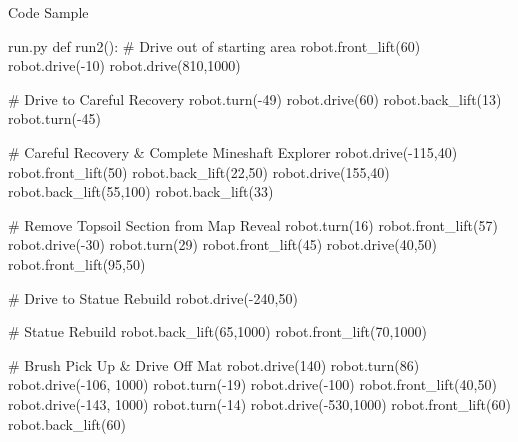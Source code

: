 \documentclass[11pt,a4paper]{article}
\begin{document}
\thispagestyle{empty}

\begin{center}
	\Huge Code Sample
\end{center}

\hfill

\begin{mycodelisting}{run.py}
def run2():
    # Drive out of starting area
    robot.front_lift(60)
    robot.drive(-10)
    robot.drive(810,1000)

    # Drive to Careful Recovery
    robot.turn(-49)
    robot.drive(60)
    robot.back_lift(13)
    robot.turn(-45)

    # Careful Recovery & Complete Mineshaft Explorer
    robot.drive(-115,40)
    robot.front_lift(50)
    robot.back_lift(22,50)
    robot.drive(155,40)
    robot.back_lift(55,100)
    robot.back_lift(33)

    # Remove Topsoil Section from Map Reveal
    robot.turn(16)
    robot.front_lift(57)
    robot.drive(-30)
    robot.turn(29)
    robot.front_lift(45)
    robot.drive(40,50)
    robot.front_lift(95,50)

    # Drive to Statue Rebuild
    robot.drive(-240,50)

    # Statue Rebuild
    robot.back_lift(65,1000)
    robot.front_lift(70,1000)

    # Brush Pick Up & Drive Off Mat
    robot.drive(140)
    robot.turn(86)
    robot.drive(-106, 1000)
    robot.turn(-19)
    robot.drive(-100)
    robot.front_lift(40,50)
    robot.drive(-143, 1000)
    robot.turn(-14)
    robot.drive(-530,1000)
    robot.front_lift(60)
    robot.back_lift(60)
\end{mycodelisting}
\end{document}
